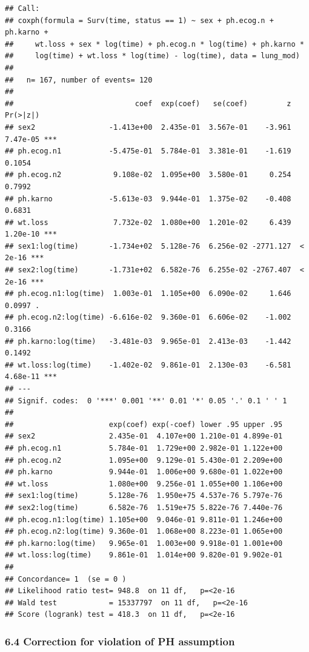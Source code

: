 \documentclass[
]{article}
\begin{document}
\begin{verbatim}
## Call:
## coxph(formula = Surv(time, status == 1) ~ sex + ph.ecog.n + ph.karno + 
##     wt.loss + sex * log(time) + ph.ecog.n * log(time) + ph.karno * 
##     log(time) + wt.loss * log(time) - log(time), data = lung_mod)
## 
##   n= 167, number of events= 120 
## 
##                            coef  exp(coef)   se(coef)         z Pr(>|z|)    
## sex2                 -1.413e+00  2.435e-01  3.567e-01    -3.961 7.47e-05 ***
## ph.ecog.n1           -5.475e-01  5.784e-01  3.381e-01    -1.619   0.1054    
## ph.ecog.n2            9.108e-02  1.095e+00  3.580e-01     0.254   0.7992    
## ph.karno             -5.613e-03  9.944e-01  1.375e-02    -0.408   0.6831    
## wt.loss               7.732e-02  1.080e+00  1.201e-02     6.439 1.20e-10 ***
## sex1:log(time)       -1.734e+02  5.128e-76  6.256e-02 -2771.127  < 2e-16 ***
## sex2:log(time)       -1.731e+02  6.582e-76  6.255e-02 -2767.407  < 2e-16 ***
## ph.ecog.n1:log(time)  1.003e-01  1.105e+00  6.090e-02     1.646   0.0997 .  
## ph.ecog.n2:log(time) -6.616e-02  9.360e-01  6.606e-02    -1.002   0.3166    
## ph.karno:log(time)   -3.481e-03  9.965e-01  2.413e-03    -1.442   0.1492    
## wt.loss:log(time)    -1.402e-02  9.861e-01  2.130e-03    -6.581 4.68e-11 ***
## ---
## Signif. codes:  0 '***' 0.001 '**' 0.01 '*' 0.05 '.' 0.1 ' ' 1
## 
##                      exp(coef) exp(-coef) lower .95 upper .95
## sex2                 2.435e-01  4.107e+00 1.210e-01 4.899e-01
## ph.ecog.n1           5.784e-01  1.729e+00 2.982e-01 1.122e+00
## ph.ecog.n2           1.095e+00  9.129e-01 5.430e-01 2.209e+00
## ph.karno             9.944e-01  1.006e+00 9.680e-01 1.022e+00
## wt.loss              1.080e+00  9.256e-01 1.055e+00 1.106e+00
## sex1:log(time)       5.128e-76  1.950e+75 4.537e-76 5.797e-76
## sex2:log(time)       6.582e-76  1.519e+75 5.822e-76 7.440e-76
## ph.ecog.n1:log(time) 1.105e+00  9.046e-01 9.811e-01 1.246e+00
## ph.ecog.n2:log(time) 9.360e-01  1.068e+00 8.223e-01 1.065e+00
## ph.karno:log(time)   9.965e-01  1.003e+00 9.918e-01 1.001e+00
## wt.loss:log(time)    9.861e-01  1.014e+00 9.820e-01 9.902e-01
## 
## Concordance= 1  (se = 0 )
## Likelihood ratio test= 948.8  on 11 df,   p=<2e-16
## Wald test            = 15337797  on 11 df,   p=<2e-16
## Score (logrank) test = 418.3  on 11 df,   p=<2e-16
\end{verbatim}

\hypertarget{correction-for-violation-of-ph-assumption}{%
\subsubsection{6.4 Correction for violation of PH
assumption}\label{correction-for-violation-of-ph-assumption}}
\end{document}
